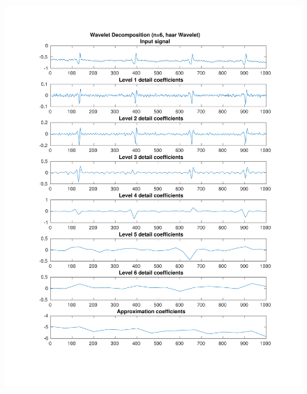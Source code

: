 \documentclass[11pt,a4paper]{article}
\begin{document}
\begin{figure}[H]
\centering
\begin{minipage}{0.48\textwidth}
	\centering
	\includegraphics[width=\textwidth]{fig/112l2_dwt1.pdf}
	

\end{minipage}
\end{figure}
\end{document}
